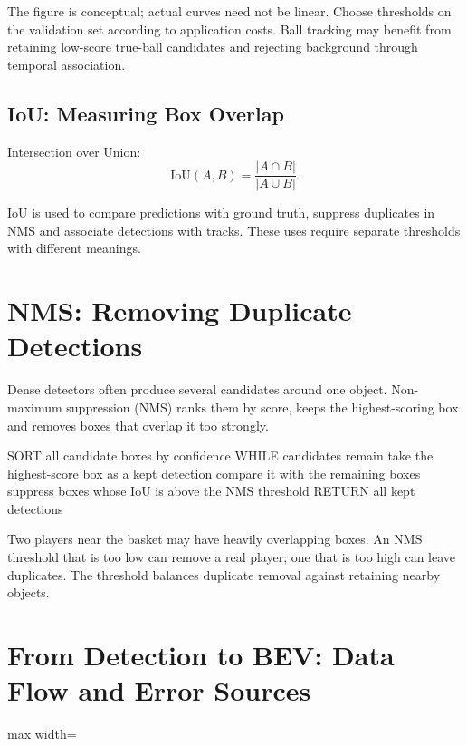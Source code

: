 \documentclass[11pt,a4paper,oneside]{report}
\begin{document}
The figure is conceptual; actual curves need not be linear. Choose thresholds on the validation set according to application costs. Ball tracking may benefit from retaining low-score true-ball candidates and rejecting background through temporal association.

\subsection{IoU: Measuring Box Overlap}

Intersection over Union:
\[
\mathrm{IoU}(A,B)=\frac{|A\cap B|}{|A\cup B|}.
\]

IoU is used to compare predictions with ground truth, suppress duplicates in NMS and associate detections with tracks. These uses require separate thresholds with different meanings.

\section{NMS: Removing Duplicate Detections}

Dense detectors often produce several candidates around one object. Non-maximum suppression (NMS) ranks them by score, keeps the highest-scoring box and removes boxes that overlap it too strongly.

\begin{pseudoBox}
SORT all candidate boxes by confidence
WHILE candidates remain
  take the highest-score box as a kept detection
  compare it with the remaining boxes
  suppress boxes whose IoU is above the NMS threshold
RETURN all kept detections
\end{pseudoBox}

\begin{riskBox}
Two players near the basket may have heavily overlapping boxes. An NMS threshold that is too low can remove a real player; one that is too high can leave duplicates. The threshold balances duplicate removal against retaining nearby objects.
\end{riskBox}

\section{From Detection to BEV: Data Flow and Error Sources}

\begin{center}
\begin{adjustbox}{max width=\linewidth}
\end{adjustbox}
\end{center}
\end{document}
